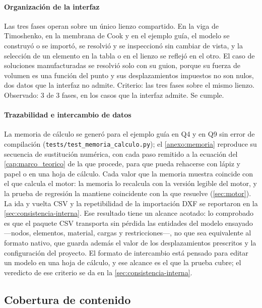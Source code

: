 \paragraph{Organización de la interfaz} Las tres fases operan sobre un único lienzo compartido. En la viga de Timoshenko, en la membrana de Cook y en el ejemplo guía, el modelo se construyó o se importó, se resolvió y se inspeccionó sin cambiar de vista, y la selección de un elemento en la tabla o en el lienzo se reflejó en el otro. El caso de soluciones manufacturadas se resolvió solo con su guion, porque su fuerza de volumen es una función del punto y sus desplazamientos impuestos no son nulos, dos datos que la interfaz no admite. Criterio: las tres fases sobre el mismo lienzo. Observado: 3 de 3 fases, en los casos que la interfaz admite. Se cumple.

\paragraph{Trazabilidad e intercambio de datos} La memoria de cálculo se generó para el ejemplo guía en Q4 y en Q9 sin error de compilación (\mbox{\texttt{tests/test\_memoria\_calculo.py}}); el \autoref{anexo:memoria} reproduce su secuencia de sustitución numérica, con cada paso remitido a la ecuación del \autoref{cap:marco_teorico} de la que procede, para que pueda rehacerse con lápiz y papel o en una hoja de cálculo. Cada valor que la memoria muestra coincide con el que calcula el motor: la memoria lo recalcula con la versión legible del motor, y la prueba de regresión la mantiene coincidente con la que resuelve (\autoref{sec:motor}). La ida y vuelta CSV y la repetibilidad de la importación DXF se reportaron en la \autoref{sec:consistencia-interna}. Ese resultado tiene un alcance acotado: lo comprobado es que el paquete CSV transporta sin pérdida las entidades del modelo ensayado —nodos, elementos, material, cargas y restricciones—, no que sea equivalente al formato nativo, que guarda además el valor de los desplazamientos prescritos y la configuración del proyecto. El formato de intercambio está pensado para editar un modelo en una hoja de cálculo, y ese alcance es el que la prueba cubre; el veredicto de ese criterio se da en la \autoref{sec:consistencia-interna}.

\subsection{Cobertura de contenido}
\label{sec:contenido-didactico}

